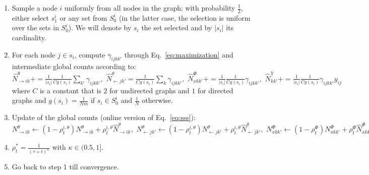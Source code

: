 \begin{enumerate}
\item Sample a node $i$ uniformly from all nodes in the graph; with probability $\frac{1}{2}$, either select $s_1^i$ or any set from $S_0^i$ (in the latter case, the selection is uniform over the sets in $S_0^i$). We will denote by $s_i$ the set selected and by $|s_i|$ its cardinality.
\item For each node $j \in s_i$, compute $\gamma_{ijkk'}$ through Eq.~\ref{eq:maximization} and intermediate global counts according to: {\small
$\hat N^{\theta}_{\rightarrow ik} += \frac{1}{|s_i|} \frac{1}{Cg(s_i)} \sum_{k'} \gamma_{ijkk'}, \,\, \hat N^{\theta}_{\leftarrow jk'} = \frac{1}{Cg(s_i)} \sum_{k} \gamma_{ijkk'}, \,\, \hat N^{\Phi}_{xkk'} += \frac{1}{|s_i|} \frac{1}{Cg(s_i)} \gamma_{ijkk'}, \,\, \hat N^{{Y}}_{kk'} += \frac{1}{|s_i|} \frac{1}{Cg(s_i)} \gamma_{ijkk'} y_{ij}$
}\\
where $C$ is a constant that is $2$ for undirected graphs and $1$ for directed graphs and $g(s_i) = \frac{1}{Nm}$ if $s_i \in S_0^i$ and $\frac{1}{N}$ otherwise.
\item Update of the global counts (online version of Eq.~\ref{eq:sss}): {\small $N^{\theta}_{\rightarrow ik} \leftarrow (1 - \rho^{i,\theta}_t) N^{\theta}_{\rightarrow ik} + \rho^{i,\theta}_t \hat N^{\theta}_{\rightarrow ik}, \,\, N^{\theta}_{\leftarrow jk'} \leftarrow (1 - \rho^{i,\theta}_t) N^{\theta}_{\leftarrow jk'} + \rho^{i,\theta}_t \hat N^{\theta}_{\leftarrow jk'}, \,\, N^{\Phi}_{xkk'} \leftarrow (1 - \rho^{\Phi}_t) N^{\Phi}_{xkk'} + \rho^{\Phi}_t \hat N^{\Phi}_{xkk'}, \,\, N^{{Y}}_{kk'} \leftarrow (1 - \rho^{{Y}}_t) N^{{Y}}_{kk'} + \rho^{{Y}}_t \hat N^{{Y}}_{kk'}$}
\item $\rho^*_t = \frac{1}{(\tau +t)^\kappa}$ with $\kappa \in (0.5, 1]$.
\item Go back to step 1 till convergence.
\end{enumerate}
